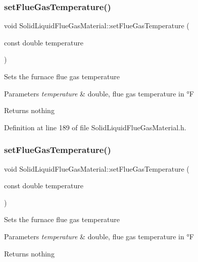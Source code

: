 \subsubsection{\texorpdfstring{set\+Flue\+Gas\+Temperature()}{setFlueGasTemperature()}\hspace{0.1cm}{\footnotesize\ttfamily [2/3]}}
{\footnotesize\ttfamily void Solid\+Liquid\+Flue\+Gas\+Material\+::set\+Flue\+Gas\+Temperature (\begin{DoxyParamCaption}\item[{const double}]{temperature }\end{DoxyParamCaption})\hspace{0.3cm}{\ttfamily [inline]}}

Sets the furnace flue gas temperature 
\begin{DoxyParams}{Parameters}
{\em temperature} & double, flue gas temperature in °F \\
\hline
\end{DoxyParams}
\begin{DoxyReturn}{Returns}
nothing 
\end{DoxyReturn}


Definition at line 189 of file Solid\+Liquid\+Flue\+Gas\+Material.\+h.

\mbox{\label{class_solid_liquid_flue_gas_material_ae647700dbff5ccea7938b2117f2c3156}} 
\subsubsection{\texorpdfstring{set\+Flue\+Gas\+Temperature()}{setFlueGasTemperature()}\hspace{0.1cm}{\footnotesize\ttfamily [3/3]}}
{\footnotesize\ttfamily void Solid\+Liquid\+Flue\+Gas\+Material\+::set\+Flue\+Gas\+Temperature (\begin{DoxyParamCaption}\item[{const double}]{temperature }\end{DoxyParamCaption})\hspace{0.3cm}{\ttfamily [inline]}}

Sets the furnace flue gas temperature 
\begin{DoxyParams}{Parameters}
{\em temperature} & double, flue gas temperature in °F \\
\hline
\end{DoxyParams}
\begin{DoxyReturn}{Returns}
nothing 
\end{DoxyReturn}


